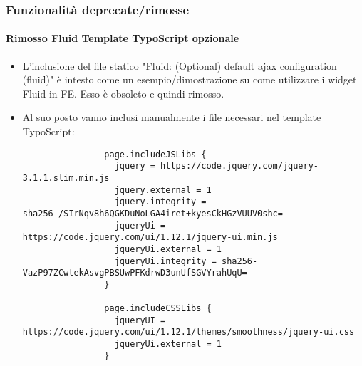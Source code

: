 \begin{frame}[fragile]
	\frametitle{Funzionalità deprecate/rimosse}
	\framesubtitle{Rimosso Fluid Template TypoScript opzionale}

	\lstset{basicstyle=\tiny\ttfamily}

	\begin{itemize}
		\item L'inclusione del file statico "Fluid: (Optional) default ajax configuration (fluid)" è intesto
			come un esempio/dimostrazione su come utilizzare i widget Fluid in FE. Esso è obsoleto e quindi rimosso.
		\item Al suo posto vanno inclusi manualmente i file necessari nel template TypoScript:

			\begin{lstlisting}
				page.includeJSLibs {
				  jquery = https://code.jquery.com/jquery-3.1.1.slim.min.js
				  jquery.external = 1
				  jquery.integrity = sha256-/SIrNqv8h6QGKDuNoLGA4iret+kyesCkHGzVUUV0shc=
				  jqueryUi = https://code.jquery.com/ui/1.12.1/jquery-ui.min.js
				  jqueryUi.external = 1
				  jqueryUi.integrity = sha256-VazP97ZCwtekAsvgPBSUwPFKdrwD3unUfSGVYrahUqU=
				}

				page.includeCSSLibs {
				  jqueryUI = https://code.jquery.com/ui/1.12.1/themes/smoothness/jquery-ui.css
				  jqueryUi.external = 1
				}
			\end{lstlisting}

	\end{itemize}

\end{frame}


